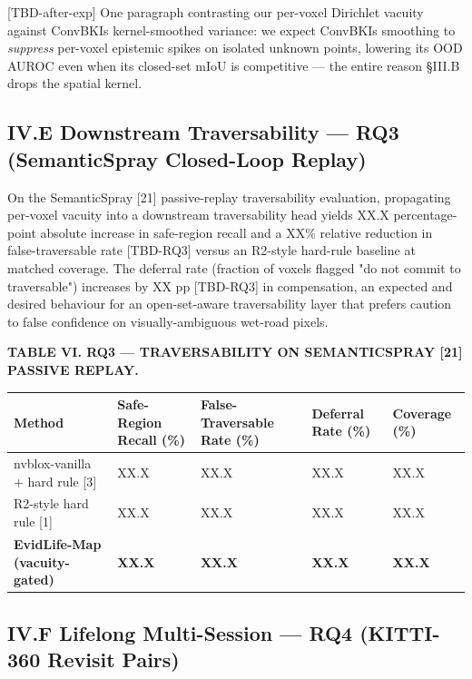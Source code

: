 \documentclass[
]{article}
\newcounter{none} %
\begin{document}
{[}TBD-after-exp{]} One paragraph contrasting our per-voxel Dirichlet
vacuity against ConvBKI\textquotesingle s kernel-smoothed variance: we
expect ConvBKI\textquotesingle s smoothing to \emph{suppress} per-voxel
epistemic spikes on isolated unknown points, lowering its OOD AUROC even
when its closed-set mIoU is competitive --- the entire reason §III.B
drops the spatial kernel.

\subsection{IV.E Downstream Traversability --- RQ3 (SemanticSpray
Closed-Loop
Replay)}\label{ive-downstream-traversability--rq3-semanticspray-closed-loop-replay}

On the SemanticSpray {[}21{]} passive-replay traversability evaluation,
propagating per-voxel vacuity into a downstream traversability head
yields XX.X percentage-point absolute increase in safe-region recall and
a XX\% relative reduction in false-traversable rate {[}TBD-RQ3{]} versus
an R2-style hard-rule baseline at matched coverage. The deferral rate
(fraction of voxels flagged "do not commit to traversable") increases by
XX pp {[}TBD-RQ3{]} in compensation, an expected and desired behaviour
for an open-set-aware traversability layer that prefers caution to false
confidence on visually-ambiguous wet-road pixels.

\textbf{TABLE VI. RQ3 --- TRAVERSABILITY ON SEMANTICSPRAY {[}21{]}
PASSIVE REPLAY.}

{\def\LTcaptype{none} %
\begin{longtable}[]{@{}lllll@{}}
\toprule\noalign{}
Method & Safe-Region Recall (\%) & False-Traversable Rate (\%) &
Deferral Rate (\%) & Coverage (\%) \\
\midrule\noalign{}
\endhead
\bottomrule\noalign{}
\endlastfoot
nvblox-vanilla + hard rule {[}3{]} & XX.X & XX.X & XX.X & XX.X \\
R2-style hard rule {[}1{]} & XX.X & XX.X & XX.X & XX.X \\
\textbf{EvidLife-Map (vacuity-gated)} & \textbf{XX.X} & \textbf{XX.X} &
\textbf{XX.X} & \textbf{XX.X} \\
\end{longtable}
}

\subsection{IV.F Lifelong Multi-Session --- RQ4 (KITTI-360 Revisit
Pairs)}\label{ivf-lifelong-multi-session--rq4-kitti-360-revisit-pairs}
\end{document}
